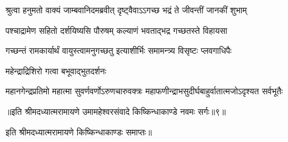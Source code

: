\twolineshloka
{श्रुत्वा हनुमतो वाक्यं जाम्बवानिदमब्रवीत्}
{दृष्ट्वैवाऽऽगच्छ भद्रं ते जीवन्तीं जानकीं शुभाम्} %

\twolineshloka
{पश्चाद्रामेण सहितो दर्शयिष्यसि पौरुषम्}
{कल्याणं भवताद्भद्र गच्छतस्ते विहायसा} %

\twolineshloka
{गच्छन्तं रामकार्यार्थं वायुस्त्वामनुगच्छतु}
{इत्याशीर्भिः समामन्त्र्य विसृष्टः प्लवगाधिपैः} %

\onelineshloka
{महेन्द्राद्रिशिरो गत्वा बभूवाद्भुतदर्शनः} %

\twolineshloka
{महानगेन्द्रप्रतिमो महात्मा सुवर्णवर्णोऽरुणचारुवक्त्रः}
{महाफणीन्द्राभसुदीर्घबाहुर्वातात्मजोऽदृश्यत सर्वभूतैः} %

{॥इति श्रीमदध्यात्मरामायणे उमामहेश्वरसंवादे किष्किन्धाकाण्डे
नवमः सर्गः॥९॥}

इति श्रीमदध्यात्मरामायणे किष्किन्धाकाण्डः समाप्तः॥